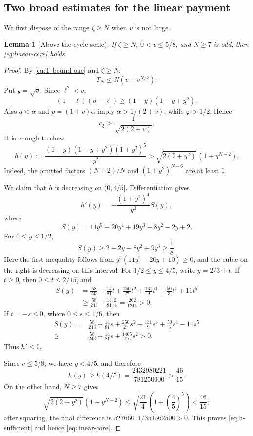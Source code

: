\documentclass[11pt]{article}
\newtheorem{lemma}[theorem]{Lemma}
\begin{document}
\subsection{Two broad estimates for the linear payment}

We first dispose of the range \(\zeta\ge N\) when \(v\) is not large.

\begin{lemma}[Above the cycle scale]\label{lem:linear-high-zeta}
If \(\zeta\ge N\), \(0<v\le5/8\), and \(N\ge7\) is odd, then
\eqref{eq:linear-core} holds.
\end{lemma}

\begin{proof}
By \eqref{eq:T-bound-one} and \(\zeta\ge N\),
\begin{equation}\label{eq:T-high-zeta}
       T_N\le N(v+v^{N/2}).
\end{equation}
Put \(y=\sqrt v\).  Since \(\ell^2<v\),
\[
       (1-\ell)(\sigma-\ell)
       \ge(1-y)(1-y+y^2).
\]
Also \(q<\alpha\) and \(p=(1+v)\alpha\) imply
\(\alpha>1/(2+v)\), while \(\varphi>1/2\).  Hence
\begin{equation}\label{eq:cxi-crude}
       c_\xi>\frac1{\sqrt{2(2+v)}}.
\end{equation}
It is enough to show
\begin{equation}\label{eq:h-sufficient}
 h(y):=
 \frac{(1-y)(1-y+y^2)(1+y^2)^5}{y^2}
 >\sqrt{2(2+y^2)}\,(1+y^{N-2}).
\end{equation}
Indeed, the omitted factors
\((N+2)/N\) and \((1+y^2)^{N-6}\) are at least \(1\).

We claim that \(h\) is decreasing on \((0,4/5]\).  Differentiation gives
\[
 h'(y)=-\frac{(1+y^2)^4}{y^3}S(y),
\]
where
\[
       S(y)=11y^5-20y^4+19y^3-8y^2-2y+2.
\]
For \(0\le y\le1/2\),
\[
 S(y)\ge2-2y-8y^2+9y^3\ge\frac18.
\]
Here the first inequality follows from
\(y^3(11y^2-20y+10)\ge0\), and the cubic on the right is decreasing on this
interval.  For \(1/2\le y\le4/5\), write \(y=2/3+t\).  If \(t\ge0\), then \(0\le t\le2/15\), and
\[
\begin{aligned}
 S(y)&=\frac{58}{243}-\frac{14}{81}t
      +\frac{250}{27}t^2+\frac{131}{9}t^3
      +\frac{50}{3}t^4+11t^5\\
 &\ge \frac{58}{243}-\frac{14}{81}\frac{2}{15}
  =\frac{262}{1215}>0.
\end{aligned}
\]
If \(t=-s\le0\), where \(0\le s\le1/6\), then
\[
\begin{aligned}
 S(y)={}&\frac{58}{243}+\frac{14}{81}s
 +\frac{250}{27}s^2-\frac{131}{9}s^3
 +\frac{50}{3}s^4-11s^5\\
 \ge{}&\frac{58}{243}+\frac{14}{81}s
 +\frac{1465}{216}s^2>0.
\end{aligned}
\]
Thus \(h'\le0\).

Since \(v\le5/8\), we have \(y<4/5\), and therefore
\[
       h(y)\ge h(4/5)
       =\frac{2432980221}{781250000}>\frac{46}{15}.
\]
On the other hand, \(N\ge7\) gives
\[
 \sqrt{2(2+y^2)}(1+y^{N-2})
 \le\sqrt{\frac{21}{4}}
       \left(1+\left(\frac45\right)^5\right)
 <\frac{46}{15};
\]
after squaring, the final difference is
\(52766011/351562500>0\).  This proves
\eqref{eq:h-sufficient} and hence \eqref{eq:linear-core}.
\end{proof}
\end{document}
